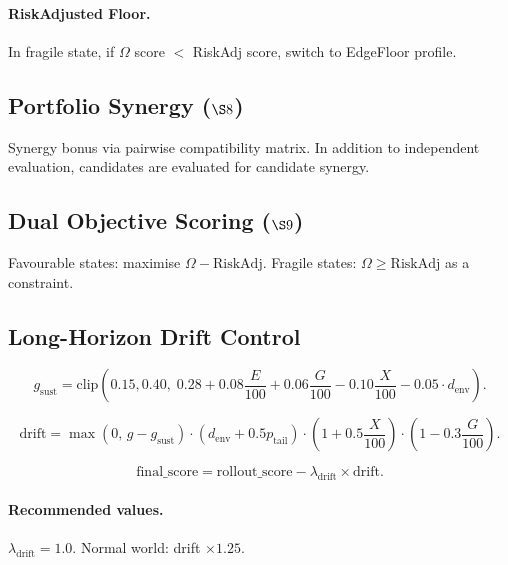 \paragraph{RiskAdjusted Floor.}
In fragile state, if $\Omega$ score $<$ RiskAdj score, switch to
EdgeFloor profile.

\subsection{Portfolio Synergy ($\S 8$)}
\label{sec:omega-portfolio-synergy}

Synergy bonus via pairwise compatibility matrix. In addition to
independent evaluation, candidates are evaluated for candidate
synergy.

\subsection{Dual Objective Scoring ($\S 9$)}
\label{sec:omega-dual-scoring}

Favourable states: maximise $\Omega - \mathrm{RiskAdj}$.
Fragile states: $\Omega \ge \mathrm{RiskAdj}$ as a constraint.

\subsection{Long-Horizon Drift Control}
\label{sec:omega-drift-control}

\begin{equation}
g_{\mathrm{sust}} = \mathrm{clip}\!\left(0.15, 0.40,\;
0.28 + 0.08 \frac{E}{100} + 0.06 \frac{G}{100}
- 0.10 \frac{X}{100} - 0.05 \cdot d_{\mathrm{env}}\right).
\label{eq:omega-gsust}
\end{equation}

\begin{equation}
\mathrm{drift} = \max(0,\, g - g_{\mathrm{sust}}) \cdot
(d_{\mathrm{env}} + 0.5 p_{\mathrm{tail}}) \cdot
\!\left(1 + 0.5 \frac{X}{100}\right) \cdot
\!\left(1 - 0.3 \frac{G}{100}\right).
\label{eq:omega-drift}
\end{equation}

\begin{equation}
\mathrm{final\_score} = \mathrm{rollout\_score} -
\lambda_{\mathrm{drift}} \times \mathrm{drift}.
\label{eq:omega-final-score}
\end{equation}

\paragraph{Recommended values.}
$\lambda_{\mathrm{drift}} = 1.0$. Normal world: drift $\times 1.25$.

